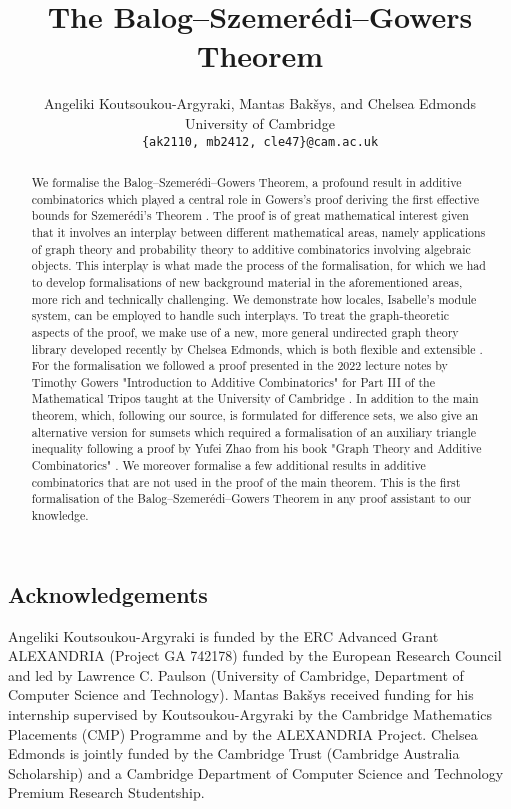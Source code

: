 \documentclass[11pt,a4paper]{article}
\begin{document}
\title{The Balog--Szemer\'{e}di--Gowers Theorem}
\author{Angeliki Koutsoukou-Argyraki, Mantas Bak\v{s}ys, and Chelsea Edmonds\\
University of Cambridge\\
\texttt{\{ak2110, mb2412, cle47\}@cam.ac.uk}}

\maketitle

\begin{abstract}
We formalise the Balog--Szemer\'{e}di--Gowers Theorem,  a profound result in additive combinatorics  which played a central role in Gowers's  proof deriving the first effective bounds for Szemer\'{e}di's Theorem \cite{GowersnewSzemeredi}.
The proof is of great mathematical interest given that it involves an interplay between different mathematical areas, namely applications of graph theory and probability theory to additive combinatorics involving algebraic objects.
This interplay is what made the process of the formalisation, for which we had to develop formalisations of new background material in the aforementioned areas, more rich and technically challenging.  We demonstrate how locales, Isabelle's module system, can be employed to handle such interplays.
To treat the graph-theoretic aspects of the
proof, we make use of a new, more general undirected graph theory library developed recently by Chelsea Edmonds, which is both flexible and extensible \cite{Undirected_Graph_Theory-AFP}.
For the formalisation we followed a proof presented in the 2022 lecture notes by Timothy
Gowers "Introduction to Additive Combinatorics"  for Part III of the Mathematical Tripos taught at the University of Cambridge \cite{Gowersnotes}.
 In addition to the main theorem, which, following our source, is formulated for difference sets, we
also give an alternative version for sumsets which required a formalisation of an auxiliary triangle inequality
following a proof by Yufei Zhao from his book "Graph Theory and Additive
Combinatorics" \cite{Zhaobook}.
We moreover formalise a few
additional results  in additive combinatorics that are not used in the proof of the main theorem.
This is the first formalisation of the Balog--Szemer\'{e}di--Gowers Theorem in any proof assistant to our knowledge.

\end{abstract}
\newpage
\tableofcontents

\subsection*{Acknowledgements}
Angeliki Koutsoukou-Argyraki is funded by the ERC Advanced Grant ALEXANDRIA (Project GA
742178) funded by the European Research Council and led by Lawrence C. Paulson
(University of Cambridge, Department of Computer Science and Technology).
Mantas Bak\v{s}ys received funding for his internship supervised by Koutsoukou-Argyraki by the
Cambridge Mathematics Placements (CMP) Programme and by the ALEXANDRIA Project.
Chelsea Edmonds is jointly funded by the Cambridge Trust
(Cambridge Australia Scholarship) and a Cambridge Department of Computer Science and Technology Premium Research
Studentship.
\newpage






\end{document}
